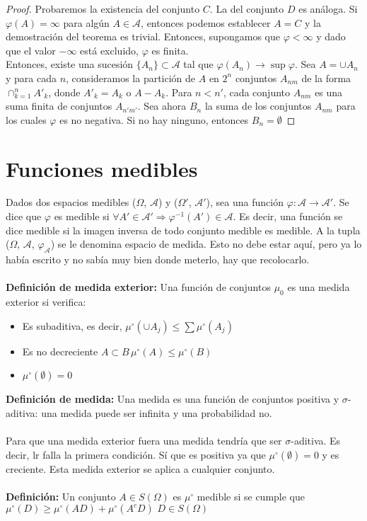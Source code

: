 \documentclass[12pt,a4paper]{book}
\begin{document}
\begin{proof}
Probaremos la existencia del conjunto $C$. La del conjunto $D$ es análoga. Si $\varphi(A) = \infty$ para algún $A \in \mathcal{A}$, entonces podemos establecer $A = C$ y la demostración del teorema es trivial. Entonces, supongamos que $\varphi < \infty$ y dado que el valor $-\infty$ está excluido, $\varphi$ es finita.\\

Entonces, existe una sucesión $\{A_n\} \subset \mathcal{A}$ tal que $\varphi(A_n) \to \sup \varphi$. Sea $A = \cup A_n $ y para cada $n$, consideramos la partición de $A$ en $2^n$ conjuntos $A_{nm}$ de la forma $\displaystyle \cap_{k=1}^n A'_k$, donde $A'_k = A_k$ o $A - A_k$. Para $n < n'$, cada conjunto $A_{nm}$ es una suma finita de conjuntos $A_{n'm'}$. Sea ahora $B_n$ la suma de los conjuntos $A_{nm}$ para los cuales $\varphi$ es no negativa. Si no hay ninguno, entonces $B_n = \emptyset$
\end{proof}

\section{Funciones medibles}

Dados dos espacios medibles ($\Omega$, $\mathcal{A}$) y ($\Omega'$, $\mathcal{A}'$), sea una función $\varphi : \mathcal{A} \rightarrow \mathcal{A}'$. Se dice que $\varphi$ es medible si $\forall A' \in \mathcal{A}' \Rightarrow \varphi^{-1}(A') \in \mathcal{A}$. Es decir, una función se dice medible si la imagen inversa de todo conjunto medible es medible. A la tupla ($\Omega$, $\mathcal{A}$, $\varphi_{\mathcal{A}}$) se le denomina espacio de medida. Esto no debe estar aquí, pero ya lo había escrito y no sabía muy bien donde meterlo, hay que recolocarlo.
\\\\
\textbf{Definición de medida exterior:} Una función de conjuntos $\mu_0$ es una medida exterior si verifica:
\begin{itemize}
\item Es subaditiva, es decir,  $\mu^\circ (\cup A_j)\leq \displaystyle \sum \mu^\circ (A_j)$
\item Es no decreciente $A\subset B \, \mu^\circ(A)\leq \mu^\circ(B)$
\item $\mu^\circ(\emptyset)=0$
\end{itemize}
\textbf{Definición de medida:} Una medida es una función de conjuntos positiva y $\sigma$-aditiva: una medida puede ser infinita y una probabilidad no.
\\\\
Para que una medida exterior fuera una medida tendría que ser $\sigma$-aditiva. Es decir, lr falla la primera condición. Sí que es positiva ya que $\mu^\circ(\emptyset)=0$ y es creciente. Esta medida exterior se aplica a cualquier conjunto.
\\\\
\textbf{Definición:} Un conjunto $A\in S(\Omega)$ es $\mu^\circ$ medible si se cumple que $\mu^\circ(D)\geq\mu^\circ(AD)+\mu^\circ(A^cD)\,\, D \in S(\Omega)$ 
\end{document}
